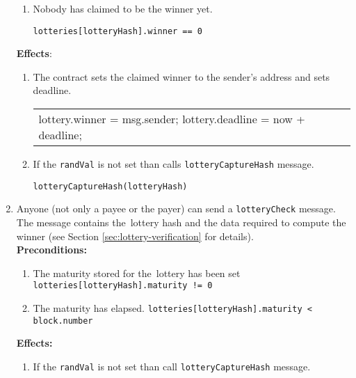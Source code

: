 \documentclass[a4paper]{article}
\begin{document}
\begin{enumerate}
\begin{enumerate}
                \item Nobody has claimed to be the winner yet.
                    \begin{center}
                        \texttt{lotteries[lotteryHash].winner == 0}
                    \end{center}
            \end{enumerate}
            \textbf{Effects}:
            \begin{enumerate}
                \item The contract sets the claimed winner to the sender's address and sets deadline.
                    \begin{center}
                        \begin{tabular}{l}
                		    lottery.winner = msg.sender;
                            lottery.deadline = now + deadline;
                        \end{tabular}
                    \end{center}
                \item If the \texttt{randVal} is not set than calls \texttt{lotteryCaptureHash} message.
                    \begin{center}
                        \texttt{lotteryCaptureHash(lotteryHash)}
                    \end{center}
            \end{enumerate}
        \item Anyone (not only a payee or the payer) can send a \texttt{lotteryCheck} message. The message contains
            the~lottery hash and the data required to compute the winner (see Section \ref{sec:lottery-verification}
            for details).\\
            \textbf{Preconditions:}
            \begin{enumerate}
                \item The maturity stored for the~lottery has been set
                    \texttt{lotteries[lotteryHash].maturity != 0}
                \item The maturity has elapsed.
	                \texttt{lotteries[lotteryHash].maturity < block.number}
	        \end{enumerate}
	        \textbf{Effects:}
	        \begin{enumerate}
                \item If the \texttt{randVal} is not set than call \texttt{lotteryCaptureHash} message.
                    \begin{center}

\end{center}
\end{enumerate}
\end{enumerate}
\end{document}
